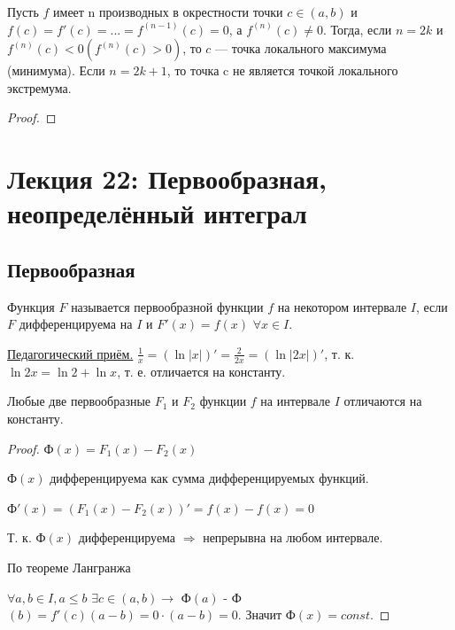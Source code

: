 	\begin{theorem}
		Пусть $f$ имеет n производных в окрестности точки $c \in (a, b)$ и $f(c) = f'(c) =	... = f^{(n - 1)}(c) = 0$, а $f^{(n)}(c) \neq 0$. Тогда, если $n = 2k$ и $f^{(n)}(c) < 0 (f^{(n)}(c) > 0)$, то $c$ — точка локального максимума (минимума). Если $n = 2k + 1$, то точка c не является точкой локального экстремума.
	\end{theorem}
	
	\begin{proof}
	\end{proof}
	
	\newpage
	
	\section{Лекция 22: Первообразная, неопределённый интеграл}
	
	\subsection{Первообразная}
	
	\begin{definition}
		Функция $F$ называется первообразной функции $f$ на некотором интервале $I$, если $F$ дифференцируема на $I$ и $F'(x) = f(x)$ $\forall x \in I$.
	\end{definition}
	
	\underline{Педагогический приём.}
	$\frac{1}{x} = (\ln{|x|})' = \frac{2}{2x} = (\ln{|2x|})'$, т. к. $\ln{2x} = \ln{2} + \ln{x}$, т. е. отличается на константу.
	
	\begin{lemma}
		Любые две первообразные $F_1$ и $F_2$ функции $f$ на интервале $I$ отличаются на константу.
	\end{lemma}
	
	\begin{proof}
		Ф$(x) = F_1(x) - F_2(x)$
		
		Ф$(x)$ дифференцируема как сумма дифференцируемых функций.
		
		Ф$'(x) = (F_1(x) - F_2(x))' = f(x) - f(x) = 0$
		
		Т. к. Ф$(x)$ дифференцируема $\Rightarrow$ непрерывна на любом интервале.
		
		По теореме Лангранжа 
		
		$\forall a, b \in I, a \leqslant b$ $\exists c \in (a, b) \rightarrow$ Ф$(a)$ - Ф$(b) = f'(c)(a - b) = 0 \cdot (a - b) = 0.$ Значит Ф$(x) = const$.
	\end{proof}
	
